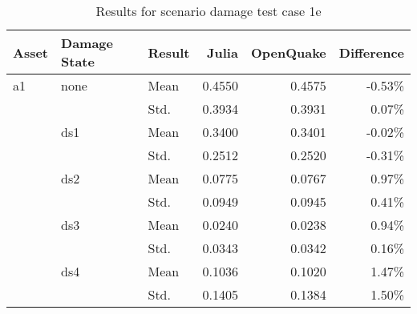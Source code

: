 \begin{table}[htbp]

\centering
\begin{tabular}{ l l l r r r }

\hline
\rowcolor{anti-flashwhite}
\bf{Asset} & \bf{Damage State} & \bf{Result} & \bf{Julia} & \bf{OpenQuake} & \bf{Difference}\\
\hline
a1 & none & Mean & 0.4550 & 0.4575 & -0.53\% \\
   &      & Std. & 0.3934 & 0.3931 & 0.07\% \\
   & ds1  & Mean & 0.3400 & 0.3401 & -0.02\% \\
   &      & Std. & 0.2512 & 0.2520 & -0.31\% \\
   & ds2  & Mean & 0.0775 & 0.0767 & 0.97\% \\
   &      & Std. & 0.0949 & 0.0945 & 0.41\% \\
   & ds3  & Mean & 0.0240 & 0.0238 & 0.94\% \\
   &      & Std. & 0.0343 & 0.0342 & 0.16\% \\
   & ds4  & Mean & 0.1036 & 0.1020 & 1.47\% \\
   &      & Std. & 0.1405 & 0.1384 & 1.50\% \\
\hline
\end{tabular}

\caption{Results for scenario damage test case 1e}
\label{tab:result-sd-1e}
\end{table}